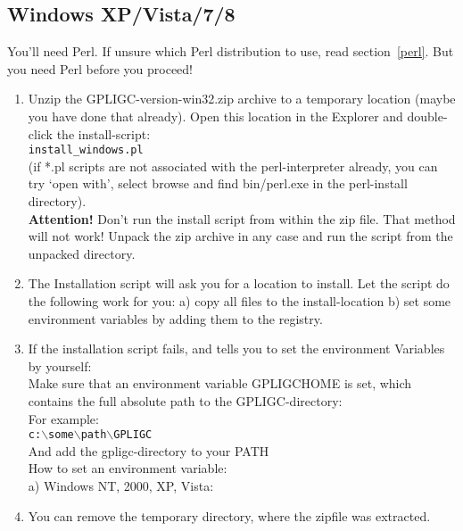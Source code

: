 \subsection{Windows XP/Vista/7/8}
\label{windows_install}


You'll need Perl. If unsure which Perl distribution to use, read section~\ref{perl}. But you need Perl before you proceed!

\begin{enumerate}

\item Unzip the GPLIGC-version-win32.zip archive to a temporary location
(maybe you have done that already).
Open this location in the Explorer and double-click the install-script: \\
\texttt{install\_windows.pl} \\
(if *.pl scripts are not associated with the perl-interpreter already,
you can try `open with', select browse and find bin/perl.exe in the
perl-install directory).\\
\textbf{Attention!} Don't run the install script from within the zip file. That method will not work!
Unpack the zip archive in any case and run the script from the unpacked directory.

\item The Installation script will ask you for a location to install.
Let the script do the following work for you:
a) copy all files to the install-location
b) set some environment variables by adding them to the registry.


\item If the installation script fails, and tells you to set the environment Variables
by yourself:\\
Make sure that an environment variable GPLIGCHOME is set,
which contains the full absolute path to the GPLIGC-directory:\\
For example: \\
\texttt{c:$\backslash$some$\backslash$path$\backslash$GPLIGC} \\
And add the gpligc-directory to your PATH \\
How to set an environment variable: \\
a) Windows NT, 2000, XP, Vista: \\


\item You can remove the temporary directory, where the zipfile was extracted.


\end{enumerate}
